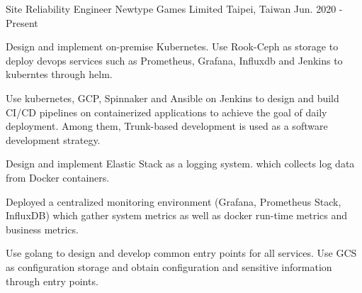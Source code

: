 

\begin{cventries}

\cventry
{Site Reliability Engineer} %
{Newtype Games Limited} %
{Taipei, Taiwan} %
{Jun. 2020 - Present} %
{
  \begin{cvitems} %
    \item {Design and implement on-premise Kubernetes. Use Rook-Ceph as storage to deploy devops services such as Prometheus, Grafana, Influxdb and Jenkins to kuberntes through helm.}
    \item {Use kubernetes, GCP, Spinnaker and Ansible on Jenkins to design and build CI/CD pipelines on containerized applications to achieve the goal of daily deployment. Among them, Trunk-based development is used as a software development strategy.}
    \item {Design and implement Elastic Stack as a logging system. which collects log data from Docker containers.}
    \item {Deployed a centralized monitoring environment (Grafana, Prometheus Stack, InfluxDB) which gather system metrics as well as docker run-time metrics and business metrics.}
    \item {Use golang to design and develop common entry points for all services. Use GCS as configuration storage and obtain configuration and sensitive information through entry points.}
  \end{cvitems}
}


\end{cventries}
